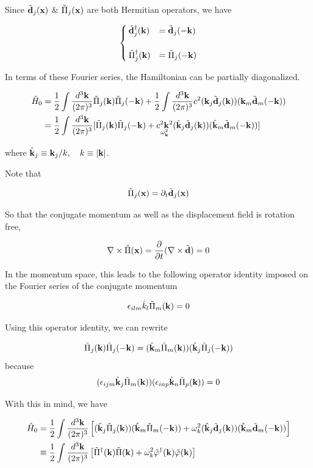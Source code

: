Since $\tilde{\bf d}_j({\bf x})$ \& $\tilde{\Pi}_j({\bf x})$ are both Hermitian operators, we have

\[\begin{cases}
\tilde{\bf d}_j^\dagger({\bf k}) &= \tilde{\bf d}_j({-\bf k})\\
\ & \\
\tilde{\Pi}_j^\dagger({\bf k}) &= \tilde{\Pi}_j(-\bf k)
\end{cases}\]

In terms of these Fourier series, the Hamiltonian can be partially diagonalized.

\[\begin{split}
\hat{H}_0 &= \frac{1}{2}\int\frac{d^3{\bf k}}{(2\pi)^3}\tilde{\Pi}_j({\bf k})\tilde{\Pi}_j({-\bf k}) + \frac{1}{2}\int\frac{d^3{\bf k}}{(2\pi)^3} c^2({\bf k}_j\tilde{\bf d}_j({\bf k}))({\bf k}_m\tilde{\bf d}_m(-{\bf k}))\\
&=\frac{1}{2}\int\frac{d^3{\bf k}}{(2\pi)^3}[\tilde{\Pi}_j({\bf k})\tilde{\Pi}_j({-\bf k})+\underset{\omega_{\bf k}^2}{c^2{\bf k}^2}(\hat{\bf k}_j\tilde{\bf d}_j({\bf k}))(\hat{\bf k}_m\tilde{\bf d}_m(-{\bf k}))]
\end{split}\]

where $\hat{\bf k}_j \equiv {\bf k}_j/k,\quad k\equiv|\bf k|$.

Note that

\[\tilde{\Pi}_j({\bf x}) = \partial_t\tilde{\bf d}_j(\bf x) \]

So that the conjugate momentum as well as the displacement field is rotation free,

\[\nabla\times\tilde{\Pi}({\bf x}) = \frac{\partial}{\partial t}(\nabla\times\tilde{\bf d}) = 0 \]

In the momentum space, this leads to the following operator identity imposed on the Fourier series of the conjugate momentum

\[\epsilon_{ilm}\hat{k}_l\tilde{\Pi}_m({\bf k}) = 0 \]

Using this operator identity, we can rewrite

\[\tilde{\Pi}_j({\bf k})\tilde{\Pi}_j({\bf -k}) = (\hat{\bf k}_m\tilde{\Pi}_m({\bf k})) (\hat{\bf k}_j\tilde{\Pi}_j({\bf -k})) \]
because
\[(\epsilon_{ijm}\hat{\bf k}_j\tilde{\Pi}_m({\bf k}))(\epsilon_{inp}\hat{\bf k}_n\tilde{\Pi}_p({\bf k})) = 0 \]

With this in mind, we have

\[\begin{split}
\hat{H}_0 &=\frac{1}{2}\int\frac{d^3{\bf k}}{(2\pi)^3}\left[(\hat{\bf k}_j\tilde{\Pi}_j({\bf k})) (\hat{\bf k}_m\tilde{\Pi}_m({\bf -k})) + \omega_k^2 (\hat{\bf k}_j\tilde{\bf d}_j({\bf k}))(\hat{\bf k}_m\tilde{\bf d}_m(-{\bf k}))\right]\\
&\equiv \frac{1}{2}\int\frac{d^3{\bf k}}{(2\pi)^3}\left[\tilde{\Pi}^\dagger({\bf k})\tilde{\Pi}({\bf k}) + \omega_k^2\tilde{\varphi}^\dagger({\bf k})\tilde{\varphi}({\bf k})\right]
\end{split}\]

